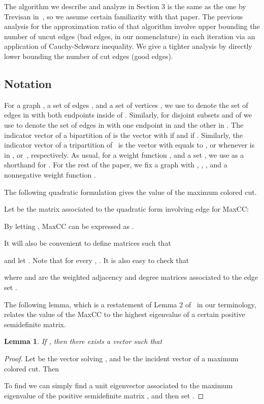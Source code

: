 \documentclass{article}
\newtheorem{lemma}[theorem]{Lemma}
\theoremstyle{definition}
\theoremstyle{remark}
\numberwithin{equation}{section}
\begin{document}
The algorithm we describe and analyze in Section 3 is the same as the one by Trevisan in~\cite{Luca}, so we assume certain familiarity with that 
paper. The previous analysis for the approximation ratio of that algorithm involve upper bounding the number of uncut edges (bad edges, in our 
nomenclature) in each iteration via an application of Cauchy-Schwarz inequality. We give a tighter analysis by directly lower bounding the 
number of cut edges (good edges).

\subsection{Notation}
For a graph , a set of edges , and a set of vertices , we use  to denote the set of edges in  with both endpoints inside of . Similarly, for disjoint subsets  and  of  we use  to denote the set of edges in  with one endpoint in  and the other in . The indicator vector of a bipartition  of  is the vector  with  if  and  if . Similarly, the indicator vector of a tripartition  of~ is the vector  with  equals to ,  or  whenever  is in ,  or~, respectively. As usual, for a weight function , and a set , we use  as a shorthand for . For the rest of the paper, we fix a graph  with , , , and a nonnegative weight function .

The following quadratic formulation gives the value of the maximum colored cut.


Let  be the matrix associated to the quadratic form involving edge  for MaxCC:

By letting , MaxCC can be expressed as . 

It will also be convenient to define matrices  such that

and let . Note that for every ,  .
It is also easy to check that

where  and  are the weighted adjacency and degree matrices associated to the edge set .

The following lemma, which is a restatement of Lemma 2 of~\cite{Luca} in our terminology, relates the value of the MaxCC to the highest eigenvalue of a certain positive semidefinite matrix.

\begin{lemma}\label{eigen}
If , then there exists a vector  such that

\end{lemma}
\begin{proof}
Let  be the vector solving  , and  be the incident vector of a maximum colored cut. Then

To find  we can simply find a unit eigenvector  associated to the maximum eigenvalue of the positive semidefinite matrix , and then set . \qquad
\end{proof}
\end{document}

